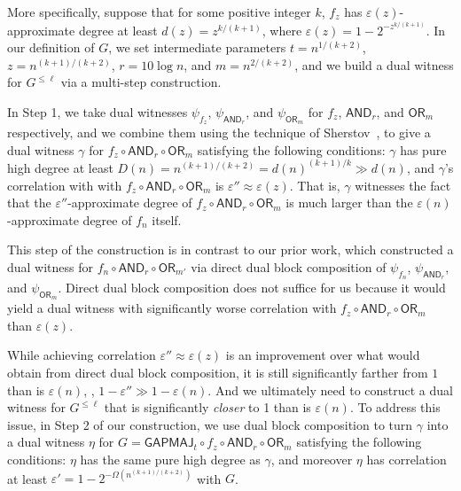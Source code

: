 \documentclass{toc}
\newcommand{\OR}{\mathsf{ OR}}
\newcommand{\GAPMAJ}{\mathsf{GAPMAJ}}
\newcommand{\eps}{\varepsilon}
\newcommand{\AND}{\mathsf{AND}}
\begin{document}
More specifically, suppose that for some positive integer $k$, $f_z$ has $\eps(z)$-approximate degree at least $d(z)=z^{k/(k+1)}$, where $\eps(z)=1-2^{-z^{k/(k+1)}}$. 
In our definition of $G$, we set intermediate parameters $t=n^{1/(k+2)}$, $z=n^{(k+1)/(k+2)}$, $r=10 \log n$, and $m=n^{2/(k+2)}$, and we build a dual witness
for $G^{\leq \ell}$ via a multi-step construction.

In Step 1, we take dual witnesses $\psi_{f_z}$, $\psi_{\AND_r}$, and $\psi_{\OR_m}$ for  $f_z$, $\AND_r$, and $\OR_{m}$
respectively, and we combine them 
using the technique of Sherstov~\cite{sherstovdp}, to give a dual witness $\gamma$ for $f_z \circ \AND_r \circ \OR_{m}$ satisfying
the following %
conditions: %
$\gamma$ has pure high degree 
at least $D(n)=n^{(k+1)/(k+2)} = d(n)^{(k+1)/k} \gg d(n)$, and $\gamma$'s correlation with  with $f_z \circ \AND_r \circ \OR_{m}$ is $\eps''\approx\eps(z)$. 
That is, $\gamma$ witnesses the fact that the $\eps''$-approximate degree of $f_z \circ \AND_r \circ \OR_{m}$ is much larger than 
the $\eps(n)$-approximate degree of $f_n$ itself. 

%
%
This step of the construction is in contrast to our prior work, which constructed a dual witness for $f_n \circ \AND_r \circ \OR_{m'}$
via direct dual block composition of $\psi_{f_n}$, $\psi_{\AND_r}$, and $\psi_{\OR_m}$. Direct dual block composition does
not suffice for us because it
would yield a dual witness with significantly worse correlation with $f_z \circ \AND_r \circ \OR_{m}$ than $\eps(z)$.

While achieving correlation $\eps'' \approx \eps(z)$ is an improvement over what would obtain
from direct dual block composition, it is still significantly farther from $1$ than is $\eps(n)$, \ie, $1-\eps'' \gg 1-\eps(n)$. And we ultimately
need to construct a dual witness for $G^{\leq \ell}$ that is significantly \emph{closer} to 1 than is $\eps(n)$.
To address this issue,
in Step 2 of our construction, we use dual block composition to turn $\gamma$ into a dual witness $\eta$ for $G=\GAPMAJ_t  \circ f_z \circ \AND_r \circ \OR_{m}$
satisfying the following %
conditions: %
$\eta$ has  the same pure high degree as $\gamma$, and moreover $\eta$ has
correlation at least $\eps'=1-2^{-\Omega(n^{(k+1)/(k+2)})}$ with $G$. 
\end{document}
